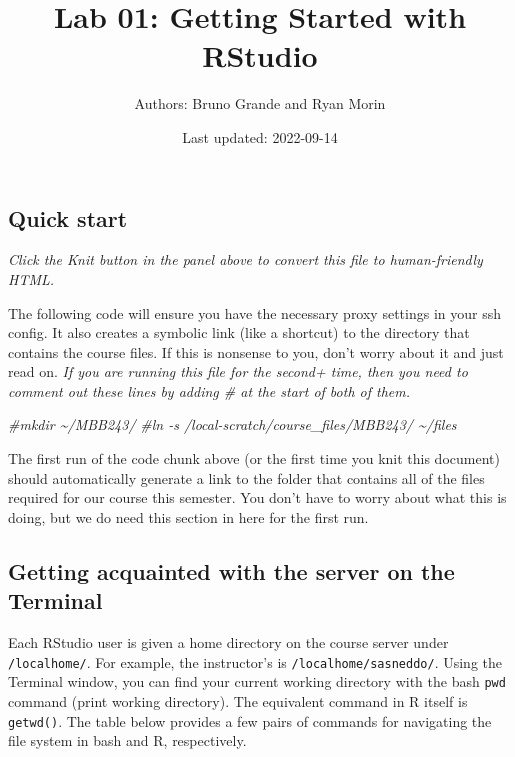 \documentclass[
]{article}
\title{Lab 01: Getting Started with RStudio}
\author{Authors: Bruno Grande and Ryan Morin}
\date{Last updated: 2022-09-14}
\newenvironment{Shaded}{\begin{snugshade}}{\end{snugshade}}
\newcommand{\CommentTok}[1]{\textcolor[rgb]{0.56,0.35,0.01}{\textit{#1}}}
\begin{document}
\maketitle

\hypertarget{quick-start}{%
\subsection{Quick start}\label{quick-start}}

\emph{Click the Knit button in the panel above to convert this file to
human-friendly HTML.}

The following code will ensure you have the necessary proxy settings in
your ssh config. It also creates a symbolic link (like a shortcut) to
the directory that contains the course files. If this is nonsense to
you, don't worry about it and just read on. \emph{If you are running
this file for the second+ time, then you need to comment out these lines
by adding \# at the start of both of them.}

\begin{Shaded}
\begin{Highlighting}[]
\CommentTok{\#mkdir \textasciitilde{}/MBB243/}
\CommentTok{\#ln {-}s /local{-}scratch/course\_files/MBB243/ \textasciitilde{}/files}
\end{Highlighting}
\end{Shaded}

The first run of the code chunk above (or the first time you knit this
document) should automatically generate a link to the folder that
contains all of the files required for our course this semester. You
don't have to worry about what this is doing, but we do need this
section in here for the first run.

\hypertarget{getting-acquainted-with-the-server-on-the-terminal}{%
\subsection{Getting acquainted with the server on the
Terminal}\label{getting-acquainted-with-the-server-on-the-terminal}}

Each RStudio user is given a home directory on the course server under
\texttt{/localhome/}. For example, the instructor's is
\texttt{/localhome/sasneddo/}. Using the Terminal window, you can find
your current working directory with the bash \texttt{pwd} command (print
working directory). The equivalent command in R itself is
\texttt{getwd()}. The table below provides a few pairs of commands for
navigating the file system in bash and R, respectively.
\end{document}
